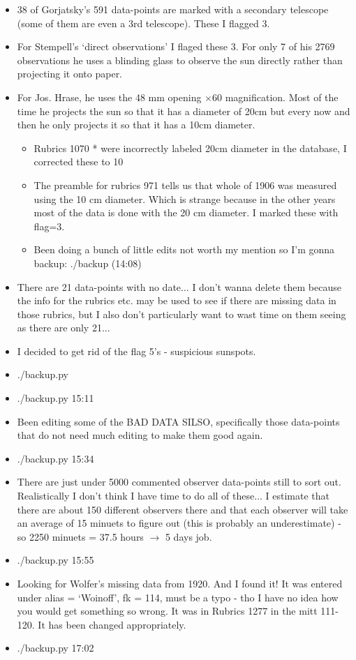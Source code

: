 \documentclass[12pt]{article}
\begin{document}
\begin{itemize}
    \item 38 of Gorjatsky's 591 data-points are marked with a secondary telescope (some of them are even a 3rd telescope). These I flagged 3.
    \item For Stempell's `direct observations' I flaged these 3. For only 7 of his 2769 observations he uses a blinding glass to observe the sun directly rather than projecting it onto paper. 
    \item For Jos. Hrase, he uses the 48 mm opening $\times 60$ magnification. Most of the time he projects the sun so that it has a diameter of 20cm but every now and then he only projects it so that it has a 10cm diameter. 
    \begin{itemize}
        \item Rubrics 1070 * were incorrectly labeled 20cm diameter in the database, I corrected these to 10
        \item The preamble for rubrics 971 tells us that whole of 1906 was measured using the 10 cm diameter. Which is strange because in the other years most of the data is done with the 20 cm diameter. I marked these with flag=3.
        \item Been doing a bunch of little edits not worth my mention so I'm gonna backup: ./backup (14:08)
    \end{itemize}
    \item There are 21 data-points with no date... I don't wanna delete them because the info for the rubrics etc. may be used to see if there are missing data in those rubrics, but I also don't particularly want to wast time on them seeing as there are only 21...
    \item I decided to get rid of the flag 5's - suspicious sunspots.
    \item ./backup.py
    \item ./backup.py 15:11
    \item Been editing some of the BAD DATA SILSO, specifically those data-points that do not need much editing to make them good again.
    \item ./backup.py 15:34
    \item There are just under 5000 commented observer data-points still to sort out. Realistically I don't think I have time to do all of these... I estimate that there are about 150 different observers there and that each observer will take an average of 15 minuets to figure out (this is probably an underestimate) - so 2250 minuets = 37.5 hours $\to$ 5 days job.
    \item ./backup.py 15:55
    \item Looking for Wolfer's missing data from 1920. And I found it! It was entered under alias = `Woinoff', fk = 114, must be a typo - tho I have no idea how you would get something so wrong. It was in Rubrics 1277 in the mitt 111-120. It has been changed appropriately.
    \item ./backup.py 17:02
\end{itemize}
\end{document}
